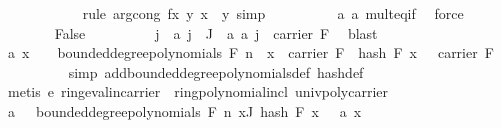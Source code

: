 \begin{isabellebody}
\ \ \ \ \ \ \ \ \ \ \isamarkupfalse%
\ {\isacharparenleft}{\kern0pt}rule\ arg{\isacharunderscore}{\kern0pt}cong{}{\isacharbrackleft}{\kern0pt}\ f{\isacharequal}{\kern0pt}{\isachardoublequoteopen}{\isasymlambda}x\ y{\isachardot}{\kern0pt}\ x\ {\isacharcircum}{\kern0pt}\ y{\isachardoublequoteclose}{\isacharbrackright}{\kern0pt}{\isacharcomma}{\kern0pt}\ simp{\isacharparenright}{\kern0pt}\isanewline
\ \ \ \ \ \ \ \ \isamarkupfalse%
\ a{\isacharunderscore}{\kern0pt}{}\ a{\isacharunderscore}{\kern0pt}{}\ mult{\isacharunderscore}{\kern0pt}eq{\isacharunderscore}{\kern0pt}if\ \isamarkupfalse%
\ force\isanewline
\ \ \ \ \isamarkupfalse%
\isanewline
\ \ \ \ \ \ \isamarkupfalse%
\ False\isanewline
\ \ \ \ \ \ \isamarkupfalse%
\ \isamarkupfalse%
\ j\ \ a{\isacharunderscore}{\kern0pt}{}{\isacharcolon}{\kern0pt}\ {\isachardoublequoteopen}j\ {\isasymin}\ J{\isacharprime}{\kern0pt}{\isachardoublequoteclose}\ \ a{\isacharunderscore}{\kern0pt}{}{\isacharcolon}{\kern0pt}\ {\isachardoublequoteopen}a\ j\ {\isasymnotin}\ carrier\ F{\isachardoublequoteclose}\ \isamarkupfalse%
\ blast\isanewline
\ \ \ \ \ \ \isamarkupfalse%
\ a{\isacharunderscore}{\kern0pt}{}{\isacharcolon}{\kern0pt}\ {\isachardoublequoteopen}{\isasymAnd}x\ {\isasymomega}{\isachardot}{\kern0pt}\ {\isasymomega}\ {\isasymin}\ bounded{\isacharunderscore}{\kern0pt}degree{\isacharunderscore}{\kern0pt}polynomials\ F\ n\ {\isasymLongrightarrow}\ x\ {\isasymin}\ carrier\ F\ {\isasymLongrightarrow}\ hash\ F\ x\ {\isasymomega}\ {\isasymin}\ carrier\ F{\isachardoublequoteclose}\isanewline
\ \ \ \ \ \ \ \ \isamarkupfalse%
\ {\isacharparenleft}{\kern0pt}simp\ add{\isacharcolon}{\kern0pt}bounded{\isacharunderscore}{\kern0pt}degree{\isacharunderscore}{\kern0pt}polynomials{\isacharunderscore}{\kern0pt}def\ hash{\isacharunderscore}{\kern0pt}def{\isacharparenright}{\kern0pt}\isanewline
\ \ \ \ \ \ \ \ \isamarkupfalse%
\ {\isacharparenleft}{\kern0pt}metis\ e\ ring{\isachardot}{\kern0pt}eval{\isacharunderscore}{\kern0pt}in{\isacharunderscore}{\kern0pt}carrier\ \ ring{\isachardot}{\kern0pt}polynomial{\isacharunderscore}{\kern0pt}incl\ univ{\isacharunderscore}{\kern0pt}poly{\isacharunderscore}{\kern0pt}carrier{\isacharparenright}{\kern0pt}\isanewline
\ \ \ \ \ \ \isamarkupfalse%
\ a{\isacharunderscore}{\kern0pt}{}{}{\isacharcolon}{\kern0pt}\ {\isachardoublequoteopen}{\isacharbraceleft}{\kern0pt}{\isasymomega}\ {\isasymin}\ bounded{\isacharunderscore}{\kern0pt}degree{\isacharunderscore}{\kern0pt}polynomials\ F\ n{\isachardot}{\kern0pt}\ {\isasymforall}x{\isasymin}J{\isacharprime}{\kern0pt}{\isachardot}{\kern0pt}\ hash\ F\ x\ {\isasymomega}\ {\isacharequal}{\kern0pt}\ a\ x{\isacharbraceright}{\kern0pt}\ {\isacharequal}{\kern0pt}\ {\isacharbraceleft}{\kern0pt}{\isacharbraceright}{\kern0pt}{\isachardoublequoteclose}\isanewline

\end{isabellebody}
